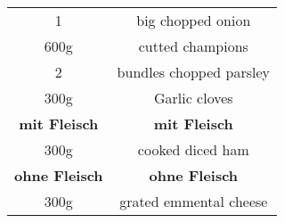 \begin{tabular}{c | c}
  1 & big chopped onion\\
  600g & cutted champions \\
  2 & bundles chopped parsley \\
  300g & Garlic cloves \\
  \textbf{mit Fleisch} & \textbf{mit Fleisch}\\
  300g & cooked diced ham \\
  \textbf{ohne Fleisch} & \textbf{ohne Fleisch}\\
  300g & grated emmental cheese \\
\end{tabular}
